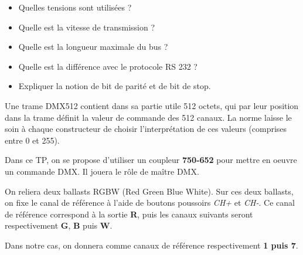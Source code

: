 \begin{UPSTIactivite}[2][Le protocole RS 485][][][Préparation]
	\label{prepa:rs485}%
    \begin{itemize} 
        \item Quelles tensions sont utilisées ? 
        \item Quelle est la vitesse de transmission ?
        \item Quelle est la longueur maximale du bus ?
        \item Quelle est la différence avec le protocole RS 232 ?
        \item Expliquer la notion de bit de parité et de bit de stop.
        \vspace{5cm}
        \end{itemize}

    \vspace{5cm}

    \vspace{1cm}
\end{UPSTIactivite}

Une trame DMX512 contient dans sa partie utile 512 octets, qui par leur position dans la trame définit la valeur de
commande des 512 canaux. La norme laisse le soin à chaque constructeur de choisir l’interprétation de ces valeurs
(comprises entre 0 et 255).
\begin{UPSTIactivite}
     \vspace{2cm}
\end{UPSTIactivite}


Dans ce TP, on se propose d'utiliser un coupleur \textbf{750-652} pour mettre en oeuvre un commande DMX. Il jouera le rôle de maître DMX. 

On reliera deux ballasts RGBW (Red Green Blue White). Sur ces deux ballasts, on fixe le canal de référence à l'aide de boutons poussoirs \textit{CH+} et \textit{CH-}. Ce canal de référence correspond à la sortie \textbf{R}, puis les canaux suivants seront respectivement \textbf{G}, \textbf{B} puis \textbf{W}. 

Dans notre cas, on donnera comme canaux de référence respectivement \textbf{1 puis 7}. 

